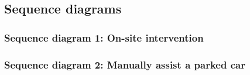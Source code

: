 \subsection{Sequence diagrams}

	\subsubsection{Sequence diagram 1: On-site intervention}
		

	\subsubsection{Sequence diagram 2: Manually assist a parked car}
	
	
